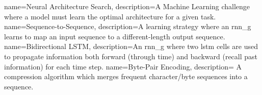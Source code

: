 {
    name={Neural Architecture Search},
    description={A Machine Learning challenge where a model must learn the optimal architecture for a given task.}
}
{
    name={Sequence-to-Sequence},
    description={A learning strategy where an \gls{rnn_g} learns to map an input sequence to a different-length output sequence.}
}
{
    name={Bidirectional LSTM},
    description={An \gls{rnn_g} where two \gls{lstm} cells are used to propagate information both forward (through time) and backward (recall past information) for each time step.}
}
{
    name={Byte-Pair Encoding},
    description={ A compression algorithm which merges frequent character/byte sequences into a sequence. }
}
